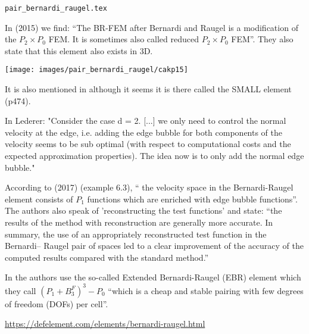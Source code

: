 \begin{flushright} {\tiny {\color{gray} \tt pair\_bernardi\_raugel.tex}} \end{flushright}

In \textcite{cakp15} (2015) we find: ``The BR-FEM after Bernardi and Raugel \cite{bera85} 
is a modification of the $P_2\times P_0$ FEM. It is sometimes also called reduced $P_2\times P_0$ FEM''.
They also state that this element also exists in 3D.

\begin{center}
\texttt{[image: images/pair\_bernardi\_raugel/cakp15]}
\end{center}

It is also mentioned in \textcite{bobf13} although it seems it is there called the SMALL element (p474).

In Lederer: "Consider the case d = 2. [...] we only need to control 
the normal velocity at the edge, i.e. adding the
edge bubble for both components of the velocity seems to be sub optimal (with respect to
computational costs and the expected approximation properties). The idea now is to only
add the normal edge bubble."

According to \textcite{jolm17} (2017) (example 6.3), `` the velocity space in the Bernardi-Raugel
element consists of $P_1$ functions which are enriched with edge bubble functions''.
The authors also speak of 'reconstructing the test functions' and state: 
``the results of the method with reconstruction are generally more accurate.
In summary, the use of an appropriately reconstructed test function in the Bernardi–
Raugel pair of spaces led to a clear improvement of the accuracy of the computed
results compared with the standard method.''

In \cite{befh21} the authors use the so-called Extended Bernardi-Raugel (EBR) element
which they call $(P_1 + B_3^F)^3 - P_0$ ``which is a cheap and stable pairing with few degrees of
freedom (DOFs) per cell''.

\url{https://defelement.com/elements/bernardi-raugel.html}


